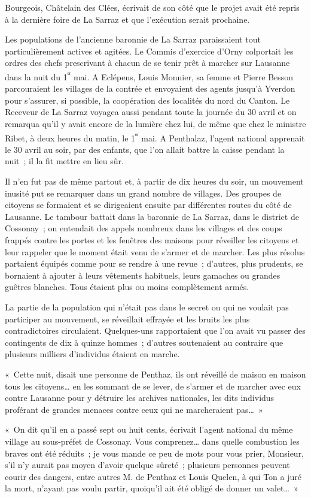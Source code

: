 \documentclass[french,twoside]{book} %
\newenvironment{quoteblock}%
  {\begin{quoting}}
  {\end{quoting}}
\newenvironment{quotebar}{%
    \def\FrameCommand{{\color{rubric!10!}\vrule width 0.5em} \hspace{0.9em}}%
    \def\OuterFrameSep{\itemsep} %
    \MakeFramed {\advance\hsize-\width \FrameRestore}
  }%
  {%
    \endMakeFramed
  }
\renewenvironment{quoteblock}%
  {%
    \savenotes
    \setstretch{0.9}
    \normalfont
    \begin{quotebar}
  }
  {%
    \end{quotebar}
    \spewnotes
  }
\begin{document}
\noindent Bourgeois, Châtelain des Clées, écrivait de son côté que le projet avait été repris à la dernière foire de La Sarraz et que l’exécution serait prochaine.\par
Les populations de l’ancienne baronnie de La Sarraz paraissaient tout particulièrement actives et agitées. Le Commis d’exercice d’Orny colportait les ordres des chefs prescrivant à chacun de se tenir prêt à marcher sur Lausanne dans la nuit du 1\textsuperscript{ᵉʳ} mai. A Eclépens, Louis Monnier, sa femme et Pierre Besson parcouraient les villages de la contrée et envoyaient des agents jusqu’à Yverdon pour s’assurer, si possible, la coopération des localités du nord du Canton. Le Receveur de La Sarraz voyagea aussi pendant toute la journée du 30 avril et on remarqua qu’il y avait encore de la lumière chez lui, de même que chez le ministre Ribet, à deux heures du matin, le 1\textsuperscript{ᵉʳ} mai. A Penthalaz, l’agent national apprenait le 30 avril au soir, par des enfants, que l’on allait battre la caisse pendant la nuit ; il la fit mettre en lieu sûr.\par
Il n’en fut pas de même partout et, à partir de dix heures du soir, un mouvement inusité put se remarquer dans un grand nombre de villages. Des groupes de citoyens se formaient et se dirigeaient ensuite par différentes routes du côté de Lausanne. Le tambour battait dans la baronnie de La Sarraz, dans le district de Cossonay ; on entendait des appels nombreux dans les villages et des coups frappés contre les portes et les fenêtres des maisons pour réveiller les citoyens et leur rappeler que le moment était venu de s’armer et de marcher. Les plus résolus partaient équipés comme pour se rendre à une revue ; d’autres, plus prudents, se bornaient à ajouter à leurs vêtements habituels, leurs gamaches ou grandes guêtres blanches. Tous étaient plus ou moins complètement armés.\par
La partie de la population qui n’était pas dans le secret ou qui ne voulait pas participer au mouvement, se réveillait effrayée et les bruits les plus contradictoires circulaient. Quelques-uns rapportaient que l’on avait vu passer des contingents de dix à quinze hommes ; d’autres soutenaient au contraire que plusieurs milliers d’individus étaient en marche.\par

\begin{quoteblock}
 \noindent « Cette nuit, disait une personne de Penthaz, ils ont réveillé de maison en maison tous les citoyens… en les sommant de se lever, de s’armer et de marcher avec eux contre Lausanne pour y détruire les archives nationales, les dits individus proférant de grandes menaces contre ceux qui ne marcheraient pas… » \par
 « On dit qu’il en a passé sept ou huit cents, écrivait l’agent national du même village au sous-préfet de Cossonay. Vous comprenez… dans quelle combustion les braves ont été réduits ; je vous mande ce peu de mots pour vous prier, Monsieur, s’il n’y aurait pas moyen d’avoir quelque sûreté ; plusieurs personnes peuvent courir des dangers, entre autres M. de Penthaz et Louis Quelen, à qui Ton a juré la mort, n’ayant pas voulu partir, quoiqu’il ait été obligé de donner un valet… »
 \end{quoteblock}
\end{document}

